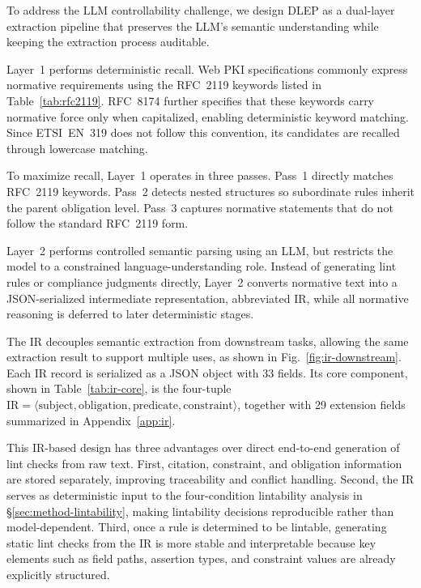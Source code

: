 To address the LLM controllability challenge, we design DLEP as a dual-layer extraction pipeline that preserves the LLM's semantic understanding while keeping the extraction process auditable.

Layer~1 performs deterministic recall.
Web PKI specifications commonly express normative requirements using the RFC~2119 keywords listed in Table~\ref{tab:rfc2119}.
RFC~8174 further specifies that these keywords carry normative force only when capitalized, enabling deterministic keyword matching.
Since ETSI~EN~319 does not follow this convention, its candidates are recalled through lowercase matching.

To maximize recall, Layer~1 operates in three passes.
Pass~1 directly matches RFC~2119 keywords.
Pass~2 detects nested structures so subordinate rules inherit the parent obligation level.
Pass~3 captures normative statements that do not follow the standard RFC~2119 form.

Layer~2 performs controlled semantic parsing using an LLM, but restricts the model to a constrained language-understanding role.
Instead of generating lint rules or compliance judgments directly, Layer~2 converts normative text into a JSON-serialized intermediate representation, abbreviated IR, while all normative reasoning is deferred to later deterministic stages.

The IR decouples semantic extraction from downstream tasks, allowing the same extraction result to support multiple uses, as shown in Fig.~\ref{fig:ir-downstream}.
Each IR record is serialized as a JSON object with 33 fields.
Its core component, shown in Table~\ref{tab:ir-core}, is the four-tuple
$\mathrm{IR} = \langle\text{subject}, \text{obligation}, \text{predicate}, \text{constraint}\rangle$,
together with 29 extension fields summarized in Appendix~\ref{app:ir}.

This IR-based design has three advantages over direct end-to-end generation of lint checks from raw text.
First, citation, constraint, and obligation information are stored separately, improving traceability and conflict handling.
Second, the IR serves as deterministic input to the four-condition lintability analysis in \S\ref{sec:method-lintability}, making lintability decisions reproducible rather than model-dependent.
Third, once a rule is determined to be lintable, generating static lint checks from the IR is more stable and interpretable because key elements such as field paths, assertion types, and constraint values are already explicitly structured.

